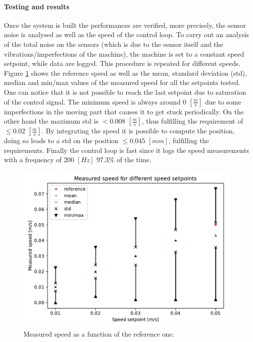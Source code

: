\documentclass[12pt,a4paper, twoside]{article}
\begin{document}
\begin{multicols}{2}
\paragraph{Testing and results}
Once the system is built the performances are verified, more precisely, the sensor noise is analysed as well as the speed of the control loop. To carry out an analysis of the total noise on the sensors (which is due to the sensor itself and the vibrations/imperfections of the machine), the machine is set to a constant speed setpoint, while data are logged. This procedure is repeated for different speeds. Figure \ref{fig:steady_state_0} shows the reference speed as well as the mean, standard deviation (std), median and min/max values of the measured speed for all the setpoints tested. One can notice that it is not possible to reach the last setpoint due to saturation of the control signal. The minimum speed is always around 0 $[\frac{m}{s}]$ due to some imperfections in the moving part that causes it to get stuck periodically. On the other hand the maximum std is $<0.008$ $[\frac{m}{s}]$, thus fulfilling the requirement of $\leq0.02$ $[\frac{m}{s}]$. By integrating the speed it is possible to compute the position, doing so leads to a std on the position $\leq 0.045$ $[mm]$, fulfilling the requirements. Finally the control loop is fast since it logs the speed measurements with a frequency of 200 $[Hz]$ 97.3\% of the time.
\begin{figure}[H]
	\centering
	\includegraphics[width=0.80\linewidth]{fig/steady_state}
	\vspace{-0.1cm}
	\caption{Measured speed as a function of the reference one.}\label{fig:steady_state_0}
	\vspace{-0.5cm}
\end{figure}

\end{multicols}
\end{document}
